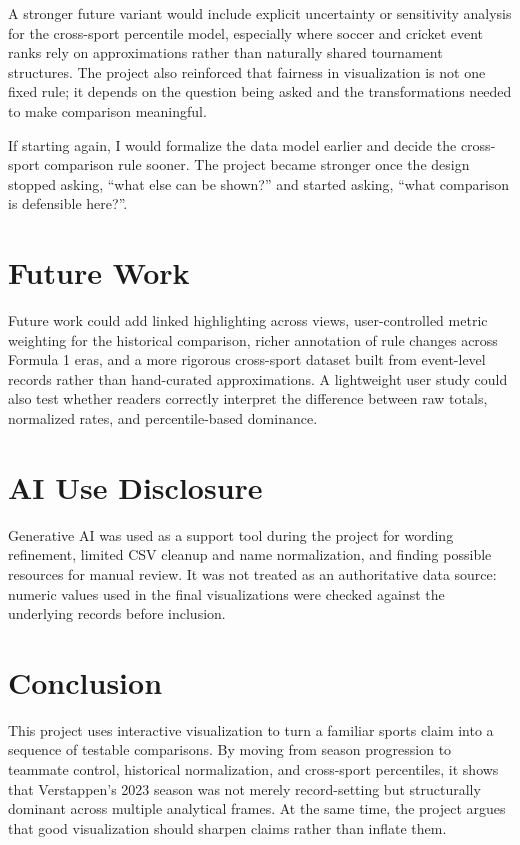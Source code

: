 \documentclass[conference]{IEEEtran}
\begin{document}
A stronger future variant would include explicit uncertainty or sensitivity analysis for the cross-sport percentile model, especially where soccer and cricket event ranks rely on approximations rather than naturally shared tournament structures. The project also reinforced that fairness in visualization is not one fixed rule; it depends on the question being asked and the transformations needed to make comparison meaningful.

If starting again, I would formalize the data model earlier and decide the cross-sport comparison rule sooner. The project became stronger once the design stopped asking, ``what else can be shown?'' and started asking, ``what comparison is defensible here?''.

\section{Future Work}
Future work could add linked highlighting across views, user-controlled metric weighting for the historical comparison, richer annotation of rule changes across Formula 1 eras, and a more rigorous cross-sport dataset built from event-level records rather than hand-curated approximations. A lightweight user study could also test whether readers correctly interpret the difference between raw totals, normalized rates, and percentile-based dominance.

\section{AI Use Disclosure}
Generative AI was used as a support tool during the project for wording refinement, limited CSV cleanup and name normalization, and finding possible resources for manual review. It was not treated as an authoritative data source: numeric values used in the final visualizations were checked against the underlying records before inclusion.

\section{Conclusion}
This project uses interactive visualization to turn a familiar sports claim into a sequence of testable comparisons. By moving from season progression to teammate control, historical normalization, and cross-sport percentiles, it shows that Verstappen's 2023 season was not merely record-setting but structurally dominant across multiple analytical frames. At the same time, the project argues that good visualization should sharpen claims rather than inflate them.



\end{document}
